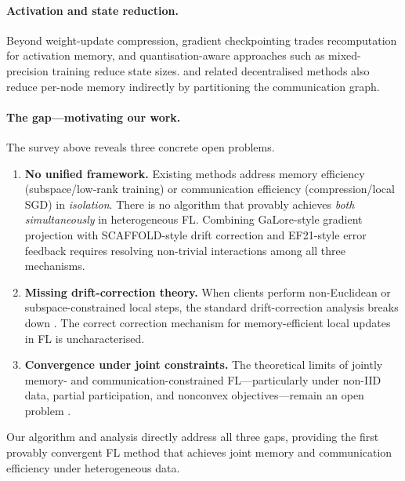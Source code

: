 \paragraph{Activation and state reduction.}
Beyond weight-update compression, gradient checkpointing trades
recomputation for activation memory, and quantisation-aware
approaches such as mixed-precision training reduce state sizes.
\citet{koloskova2019decentralized} and related decentralised methods
also reduce per-node memory indirectly by partitioning the
communication graph.

\paragraph{The gap—motivating our work.}
The survey above reveals three concrete open problems.
%
\begin{enumerate}
  \item \textbf{No unified framework.}  Existing methods address
    memory efficiency (subspace/low-rank training) or communication
    efficiency (compression/local SGD) in \emph{isolation}.  There is
    no algorithm that provably achieves \emph{both simultaneously} in
    heterogeneous FL.  Combining GaLore-style gradient projection with
    SCAFFOLD-style drift correction and EF21-style error feedback
    requires resolving non-trivial interactions among all three
    mechanisms.

  \item \textbf{Missing drift-correction theory.}  When clients
    perform non-Euclidean or subspace-constrained local steps, the
    standard drift-correction analysis breaks down
    \citep{liu2025fedmuon}.  The correct correction mechanism for
    memory-efficient local updates in FL is uncharacterised.

  \item \textbf{Convergence under joint constraints.}  The
    theoretical limits of jointly memory- and
    communication-constrained FL—particularly under non-IID data,
    partial participation, and nonconvex objectives—remain an open
    problem \citep{huang2022lower,he2023unbiased}.
\end{enumerate}
%
Our algorithm and analysis directly address all three gaps, providing
the first provably convergent FL method that achieves joint memory and
communication efficiency under heterogeneous data.
